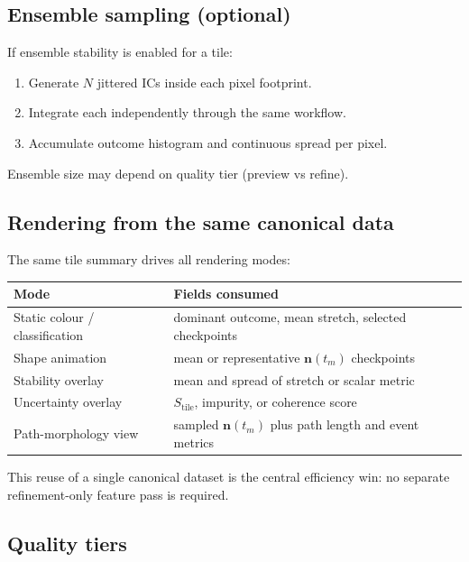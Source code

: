 \documentclass[11pt]{report}
\begin{document}
\subsection{Ensemble sampling (optional)}

If ensemble stability is enabled for a tile:
\begin{enumerate}[nosep]
\item Generate $N$ jittered ICs inside each pixel footprint.
\item Integrate each independently through the same workflow.
\item Accumulate outcome histogram and continuous spread per pixel.
\end{enumerate}
Ensemble size may depend on quality tier (preview vs refine).

\subsection{Rendering from the same canonical data}

The same tile summary drives all rendering modes:

\begin{center}
\begin{tabular}{ll}
\toprule
Mode & Fields consumed \\
\midrule
Static colour / classification & dominant outcome, mean stretch, selected checkpoints \\
Shape animation & mean or representative $\mathbf n(t_m)$ checkpoints \\
Stability overlay & mean and spread of stretch or scalar metric \\
Uncertainty overlay & $S_{\text{tile}}$, impurity, or coherence score \\
Path-morphology view & sampled $\mathbf n(t_m)$ plus path length and event metrics \\
\bottomrule
\end{tabular}
\end{center}

This reuse of a single canonical dataset is the central efficiency win: no separate refinement-only feature pass is required.

\subsection{Quality tiers}
\label{sec:quality_tiers}
\end{document}
